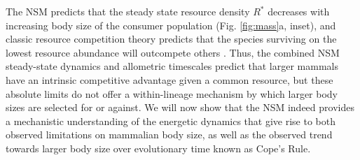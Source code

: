 \documentclass[twocolumn,preprintnumbers,amsmath,amssymb,superscriptaddress]{revtex4}
\begin{document}
\begin{bibunit}[unsrt]


The NSM predicts that the steady state resource density $R^{*}$ decreases with increasing body size of the consumer population (Fig. \ref{fig:mass}a, inset), and classic resource competition theory predicts that the species surviving on the lowest resource abundance will outcompete others \citep{tilman1981,dutkiewicz2009,barton2010}. Thus, the combined NSM steady-state dynamics and allometric timescales predict that larger mammals have an intrinsic competitive advantage given a common resource, but these absolute limits do not offer a within-lineage mechanism by which larger body sizes are selected for or against.
We will now show that the NSM indeed provides a mechanistic understanding of the energetic dynamics that give rise to both observed limitations on mammalian body size, as well as the observed trend towards larger body size over evolutionary time known as Cope's Rule.


\end{bibunit}
\end{document}
